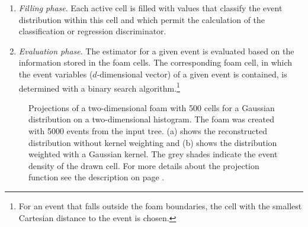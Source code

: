 \begin{enumerate}
  \item \emph{Filling phase}. Each active cell is filled with values
    that classify the event distribution within this cell and which permit
    the calculation of the classification or regression discriminator. 

  \item \emph{Evaluation phase}. The estimator for a given event is
    evaluated based on the information stored in the foam cells. The
    corresponding foam cell, in which the event variables
    ($d$-dimensional vector) of a given event is contained, is determined
    with a binary search algorithm.\footnote
    {
       For an event that falls outside the foam boundaries, the cell with the smallest 
       Cartesian distance to the event is chosen.
    }
\end{enumerate}

\begin{figure}[t]
\centering
\caption[.]{Projections of a two-dimensional foam with 500 cells 
    for a Gaussian distribution on a two-dimensional histogram. The foam
    was created with 5000 events from the input tree. (a) shows the
    reconstructed distribution without kernel weighting and (b)
    shows the distribution weighted with a Gaussian kernel.  The grey shades
    indicate the event density of the drawn cell.  For more details
    about the projection function see the description on page
    \pageref{sec:pdefoam-visualise}.}
\label{fig:pdefoam-foam}
\end{figure}

